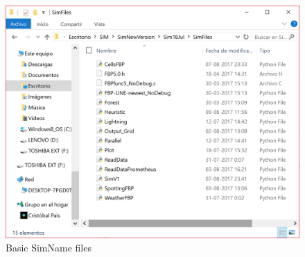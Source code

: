 \documentclass[11pt]{article}
\begin{document}
\begin{figure}[h!]
\centering
\includegraphics[scale=0.6]{SimFiles.png}
\caption{\label{fig:SFiles} Basic SimName files}
\end{figure}
\end{document}
